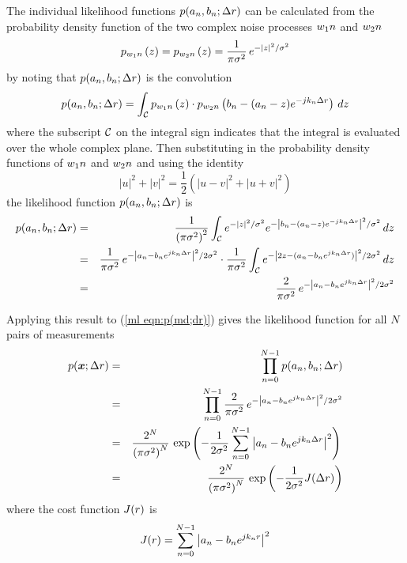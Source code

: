 The individual likelihood functions $p(a_n,b_n;{\Delta r})$ can be calculated 
from the probability density function of the two complex noise processes 
${w_1}{n}$ and ${w_2}{n}$
\begin{equation}
p_{{w_1}{n}}\left(z\right)=p_{{w_2}{n}}\left(z\right)=\frac{1}{\pi{\sigma^2}}\,{e^{-\left|z\right|^2/{\sigma^2}}}
\end{equation}
by noting that $p(a_n,b_n;{\Delta r})$ is the convolution
\begin{equation}
p(a_n,b_n;{\Delta r})=\int_{{\cal C}}p_{{w_1}{n}}\left(z\right)\cdot p_{{w_2}{n}}\left(b_n-(a_n-z){e^{-jk_n{\Delta r}}}\right)\,dz
\end{equation}
where the subscript ${\cal C}$ on the integral sign indicates that the integral
is evaluated over the whole complex plane.  Then substituting in the
probability density functions of ${w_1}{n}$ and ${w_2}{n}$ and using the identity 
\begin{equation}
\left|u\right|^2+\left|v\right|^2={\frac{1}{2}}\left(
\left|u-v\right|^2+\left|u+v\right|^2\right)
\end{equation}
the likelihood function $p(a_n,b_n;{\Delta r})$ is
\begin{eqnarray}
p(a_n,b_n;{\Delta r})
&=&\frac{1}{\left(\pi{\sigma^2}\right)^2} \int_{{\cal C}}{e^{-\left|z\right|^2/{\sigma^2}}}
{e^{-\left|b_n-(a_n-z){e^{-jk_n{\Delta r}}}\right|^2/{\sigma^2}}}\,dz {\nonumber} \\
&=&\frac{1}{\pi{\sigma^2}}\,{e^{-\left|a_n-b_n{e^{jk_n{\Delta r}}}\right|^2/2{\sigma^2}}}
\cdot\frac{1}{\pi{\sigma^2}}
	\int_{{\cal C}}{e^{-\left|2z-(a_n-b_n{e^{jk_n{\Delta r}}})\right|^2/2{\sigma^2}}}\,dz{\nonumber}\\
&=&\frac{2}{\pi{\sigma^2}}\,{e^{-\left|a_n-b_n{e^{jk_n{\Delta r}}}\right|^2/2{\sigma^2}}}
\end{eqnarray}

Applying this result to (\ref{ml eqn:p(md;dr)}) gives the likelihood
function for all $N$ pairs of measurements
\begin{eqnarray}
p(\bm{x};{\Delta r})&=&\prod_{n=0}^{N-1} p(a_n,b_n;{\Delta r}){\nonumber}\\
&=&\prod_{n=0}^{N-1} \frac{2}{\pi{\sigma^2}}\,
	{e^{-\left|a_n-b_n{e^{jk_n{\Delta r}}}\right|^2/2{\sigma^2}}}{\nonumber}\\
&=&\frac{2^N}{\left(\pi{\sigma^2}\right)^N}\,
	\exp\left(-\frac{1}{2{\sigma^2}}
	\displaystyle\sum_{n=0}^{N-1}\left|a_n-b_n{e^{jk_n{\Delta r}}}\right|^2\right){\nonumber}\\
&=&\frac{2^N}{\left(\pi{\sigma^2}\right)^N}\,
	\exp\left(-\frac{1}{2{\sigma^2}}J({\Delta r})\right)
\label{ml eqn:p(md;dr) with J(r)}
\end{eqnarray}
where the cost function $J({r})$ is
\begin{equation}\label{ml eqn:J(r)}
J({r})=\sum_{n=0}^{N-1} \left|a_n-b_n{e^{jk_n{r}}}\right|^2
\end{equation}

